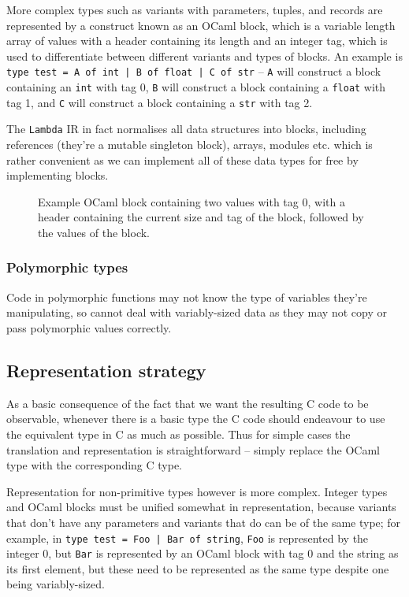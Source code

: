 \documentclass[12pt,a4paper,twoside,openright]{report}
\begin{document}
More complex types such as variants with parameters, tuples, and records are 
represented by a construct known as an OCaml block, which is a variable length 
array of values with a header containing its length and an integer tag, which 
is used to differentiate between different variants and types of blocks. An 
example is \texttt{type test = A of int | B of float | C of str} -- \texttt{A} 
will construct a block containing an \texttt{int} with tag 0, \texttt{B} will 
construct a block containing a \texttt{float} with tag 1, and \texttt{C} will 
construct a block containing a \texttt{str} with tag 2.

The \texttt{Lambda} IR in fact normalises all data structures into blocks, 
including references (they're a mutable singleton block), arrays, modules etc. 
which is rather convenient as we can implement all of these data types for free 
by implementing blocks.

\begin{figure}
    \label{fig:block-header}
    \centering
    
    \caption{Example OCaml block containing two values with tag 0, with a 
    header containing the current size and tag of the block, followed by the 
    values of the block.}
\end{figure}

\subsubsection{Polymorphic types}

Code in polymorphic functions may not know the type of variables they're 
manipulating, so cannot deal with variably-sized data as they may not copy or 
pass polymorphic values correctly.

\subsection{Representation strategy}

As a basic consequence of the fact that we want the resulting C code to be 
observable, whenever there is a basic type the C code should endeavour to use 
the equivalent type in C as much as possible. Thus for simple cases the 
translation and representation is straightforward -- simply replace the OCaml 
type with the corresponding C type.

Representation for non-primitive types however is more complex. Integer types 
and OCaml blocks must be unified somewhat in representation, because variants 
that don't have any parameters and variants that do can be of the same type; 
for example, in \texttt{type test = Foo | Bar of string}, \texttt{Foo} is 
represented by the integer 0, but \texttt{Bar} is represented by an OCaml block 
with tag 0 and the string as its first element, but these need to be 
represented as the same type despite one being variably-sized.
\end{document}

